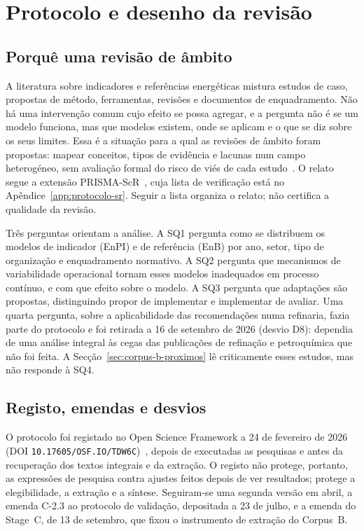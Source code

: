 \vfill
\section{Protocolo e desenho da revisão}
\label{sec:protocolo-sr}

\subsection{Porquê uma revisão de âmbito}

A literatura sobre indicadores e referências energéticas mistura estudos
de caso, propostas de método, ferramentas, revisões e documentos de
enquadramento. Não há uma intervenção comum cujo efeito se possa agregar,
e a pergunta não é se um modelo funciona, mas que modelos existem, onde
se aplicam e o que se diz sobre os seus limites. Essa é a situação para a
qual as revisões de âmbito foram propostas: mapear conceitos, tipos de
evidência e lacunas num campo heterogéneo, sem avaliação formal do risco
de viés de cada estudo~\cite{Arksey2005,Levac2010,Munn2018}. O relato segue
a extensão PRISMA-ScR~\cite{Tricco2018}, cuja lista de verificação está no
Apêndice~\ref{app:protocolo-sr}. Seguir a lista organiza o relato; não
certifica a qualidade da revisão.

Três perguntas orientam a análise. A SQ1 pergunta como se distribuem os
modelos de indicador (EnPI) e de referência (EnB) por ano, setor, tipo de
organização e enquadramento normativo. A SQ2 pergunta que mecanismos de
variabilidade operacional tornam esses modelos inadequados em processo
contínuo, e com que efeito sobre o modelo. A SQ3 pergunta que adaptações
são propostas, distinguindo propor de implementar e implementar de avaliar.
Uma quarta pergunta, sobre a aplicabilidade das recomendações numa
refinaria, fazia parte do protocolo e foi retirada a 16 de setembro de 2026
(desvio D8): dependia de uma análise integral às cegas das publicações de
refinação e petroquímica que não foi feita. A Secção~\ref{sec:corpus-b-proximos}
lê criticamente esses estudos, mas não responde à SQ4.

\subsection{Registo, emendas e desvios}

O protocolo foi registado no Open Science Framework a 24 de fevereiro de
2026 (DOI \nolinkurl{10.17605/OSF.IO/TDW6C})~\cite{Ribeiro2026Protocolo},
depois de executadas as pesquisas e antes da recuperação dos textos
integrais e da extração. O registo não protege, portanto, as expressões de
pesquisa contra ajustes feitos depois de ver resultados; protege a
elegibilidade, a extração e a síntese. Seguiram-se uma segunda versão em
abril, a emenda C-2.3 ao protocolo de validação, depositada a 23 de julho,
e a emenda do Stage~C, de 13 de setembro, que fixou o instrumento de
extração do Corpus~B.

